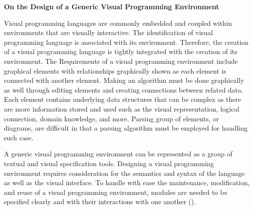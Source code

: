 \flushleft
\textbf{On the Design of a Generic Visual Programming Environment}\\
\justifying

\parx
Visual programming languages are commonly embedded and coupled within
environments that are visually interactive. The identification of visual
programming language is associated with its environment. Therefore, the creation
of a visual programming language is tightly integrated with the creation of its
environment. The Requirements of a visual programming environment include
graphical elements with relationships graphically shown as each element is
connected with another element. Making an algorithm must be done graphically as
well through editing elements and creating connections between related data.
Each element contains underlying data structures that can be complex as there
are more information stored and used such as the visual representation, logical
connection, domain knowledge, and more. Parsing group of elements, or diagrams,
are difficult in that a parsing algorithm must be employed for handling such
case.

\parx
A generic visual programming environment can be represented as a group of
textual and visual specification tools. Designing a visual programming
environment requires consideration for the semantics and syntax of the language
as well as the visual interface. To handle with ease the maintenance,
modification, and reuse of a visual programming environment, modules are needed
to be specified clearly and with their interactions with one another
(\cite{da_qian_zhang_kang_zhang}).

